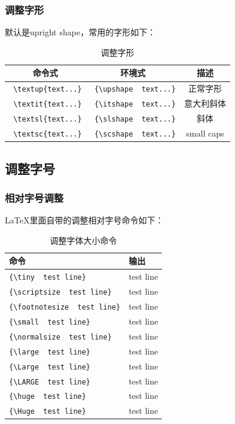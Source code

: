 \documentclass[12pt,oneside]{book}
\begin{document}
\begin{common-format}
\subsubsection{调整字形}
默认是upright shape，常用的字形如下：
\begin{table}[H]
\centering
\label{tab:调整字形}
\begin{tabular}{|c|c|c|}
\hline
命令式 & 环境式 & 描述 \\
\hline
\verb+ \textup{text...}+ & \verb+ {\upshape  text...}+  & 正常字形 \\  
\verb+ \textit{text...}+ & \verb+ {\itshape  text...}+  & 意大利斜体 \\
\verb+ \textsl{text...}+ & \verb+ {\slshape  text...}+  & 斜体 \\
\verb+ \textsc{text...}+ & \verb+ {\scshape  text...}+  & small caps \\
\hline
\end{tabular}
\caption{调整字形}
\end{table}


\subsection{调整字号}

\subsubsection{相对字号调整}
\LaTeX 里面自带的调整相对字号命令如下：
\begin{table}[H]
\centering
\label{tab:调整字体大小命令}
\begin{tabular}{|l|l|}
\hline
命令 & 输出\\
\hline
\verb+{\tiny  test line}+ & {\tiny  test line}\\
\verb+{\scriptsize  test line}+ & {\scriptsize  test line}\\
\verb+{\footnotesize  test line}+ & {\footnotesize  test line}\\
\verb+{\small  test line}+ & {\small test line}\\
\verb+{\normalsize  test line}+ & {\normalsize  test line}\\
\verb+{\large  test line}+ & {\large  test line}\\
\verb+{\Large  test line}+ & {\Large  test line}\\
\verb+{\LARGE  test line}+ & {\LARGE  test line}\\
\verb+{\huge  test line}+ & {\huge  test line}\\
\verb+{\Huge  test line}+ & {\Huge  test line}\\
\hline
\end{tabular}
\caption{调整字体大小命令}
\end{table}


\end{common-format}
\end{document}
